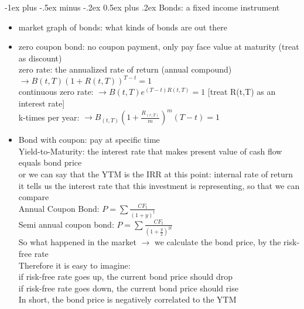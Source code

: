 \documentclass[10pt,landscape]{article}
\makeatletter
\renewcommand{\section}{\@startsection{section}{1}{0mm}%
                                {-1ex plus -.5ex minus -.2ex}%
                                {0.5ex plus .2ex}%
                                {\normalfont\large\bfseries}}
\makeatother
\begin{document}
\begin{multicols}{2}
\section{Bonds: a fixed income instrument}
\begin{itemize}
	\item market graph of bonds: what kinds of bonds are out there
	\item zero coupon bond: no coupon payment, only pay face value at maturity (treat as discount)\\
			zero rate: the annualized rate of return (annual compound) $\longrightarrow B(t,T)(1+R(t,T))^{T-t} = 1$\\
			continuous zero rate: $\longrightarrow B(t,T)e^{(T-t)R(t,T)} = 1$   [treat R(t,T) as an interest rate]\\
			k-times per year: $\longrightarrow B_{(t,T)}(1+\frac{R_{(r,T)}}{m} )^m(T-t) = 1$
	\item Bond with coupon: pay at specific time\\
			
			Yield-to-Maturity: the interest rate that makes present value of cash flow equals bond price\\
			or we can say that the YTM is the IRR at this point: internal rate of return\\
			it tells us the interest rate that this investment is representing, so that we can compare\\
			
			Annual Coupon Bond: $P = \sum \frac{CF_t}{(1+y)^t}$\\
			Semi annual coupon bond: $P = \sum \frac{CF_t}{(1+\frac{y}{2	} )^{2t}}$\\
			
			So what happened in the market $\longrightarrow$ we calculate the bond price, by the risk-free rate\\
			Therefore it is easy to imagine: \\
			if risk-free rate goes up, the current bond price should drop\\
			if risk-free rate goes down, the current bond price should rise\\
			In short, the bond price is negatively correlated to the YTM\\
			

\end{itemize}
\end{multicols}
\end{document}
